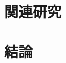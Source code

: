 \documentclass[12pt,oneside]{report}
\begin{document}


\chapter{関連研究}
\label{RelatedWorks}



\chapter{結論}
\label{conc}



\end{document}

